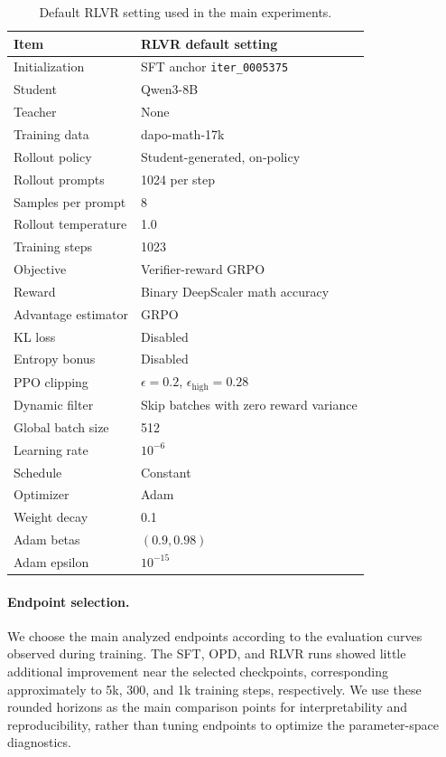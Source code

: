 \begin{table}[t]
\centering
\small
\setlength{\tabcolsep}{4pt}
\renewcommand{\arraystretch}{1.08}
\begin{tabularx}{\linewidth}{@{}lX@{}}
\toprule
\textbf{Item} & \textbf{RLVR default setting} \\
\midrule
Initialization & SFT anchor \texttt{iter\_0005375} \\
Student & Qwen3-8B \\
Teacher & None \\
Training data & dapo-math-17k \\
Rollout policy & Student-generated, on-policy \\
Rollout prompts & 1024 per step \\
Samples per prompt & 8 \\
Rollout temperature & 1.0 \\
Training steps & 1023 \\
Objective & Verifier-reward GRPO \\
Reward & Binary DeepScaler math accuracy \\
Advantage estimator & GRPO \\
KL loss & Disabled \\
Entropy bonus & Disabled \\
PPO clipping & $\epsilon=0.2$, $\epsilon_{\mathrm{high}}=0.28$ \\
Dynamic filter & Skip batches with zero reward variance \\
Global batch size & 512 \\
Learning rate & $10^{-6}$ \\
Schedule & Constant \\
Optimizer & Adam \\
Weight decay & 0.1 \\
Adam betas & $(0.9,0.98)$ \\
Adam epsilon & $10^{-15}$ \\
\bottomrule
\end{tabularx}
\caption{Default RLVR setting used in the main experiments.}
\label{tab:rlvr-default-setting}
\end{table}

\paragraph{Endpoint selection.}
We choose the main analyzed endpoints according to the evaluation curves
observed during training. The SFT, OPD, and RLVR runs showed little
additional improvement near the selected checkpoints, corresponding
approximately to 5k, 300, and 1k training steps, respectively. We use these
rounded horizons as the main comparison points for interpretability and
reproducibility, rather than tuning endpoints to optimize the
parameter-space diagnostics.

